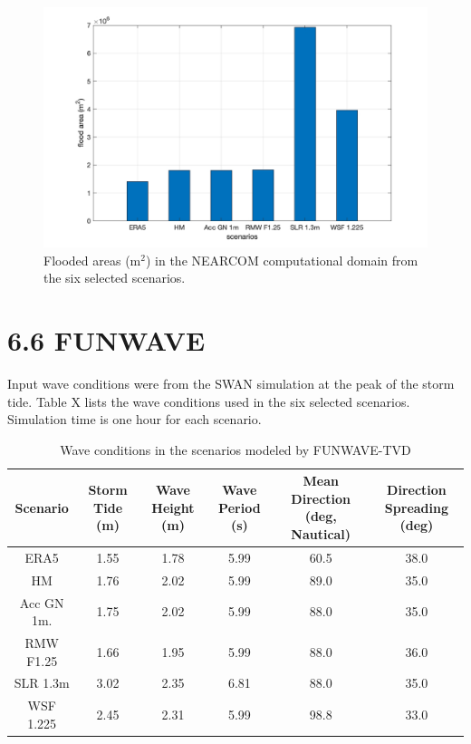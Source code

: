 \documentclass[11pt]{article}
\begin{document}
\begin{figure}[h!]
\centering
\includegraphics[width=\textwidth]{./figures/nearcom_bars.jpg}
\caption{Flooded areas (m$^2$) in the NEARCOM computational domain from the six selected scenarios.}
\label{nearcom_bars}
\centering
\end{figure}


\section*{6.6 FUNWAVE}

Input wave conditions were from the SWAN simulation at the peak of the storm tide. 
Table X lists the wave conditions used in the six selected scenarios. Simulation time is one hour for each scenario. 

\begin{table}[h!]
 \caption{Wave conditions in the scenarios modeled by FUNWAVE-TVD}
 \centering
 \begin{tabular}[t]{c c c c  c c} \hline
  Scenario & Storm Tide (m) &Wave Height (m)  &  Wave Period (s)  &  Mean Direction (deg, Nautical) &  Direction Spreading (deg)  \\ \hline
  ERA5            &  1.55    & 1.78  & 5.99  & 60.5 & 38.0  \\
  HM                &   1.76   & 2.02  & 5.99  & 89.0 & 35.0  \\
  Acc GN 1m.   &   1.75  & 2.02  & 5.99  & 88.0 & 35.0  \\
  RMW F1.25   &    1.66 & 1.95  & 5.99  & 88.0 & 36.0  \\
   SLR 1.3m      &   3.02 & 2.35  & 6.81  & 88.0 & 35.0  \\
    WSF 1.225   &   2.45  & 2.31  & 5.99  & 98.8 & 33.0  \\
     \hline
 \end{tabular}
\end{table}
\end{document}
